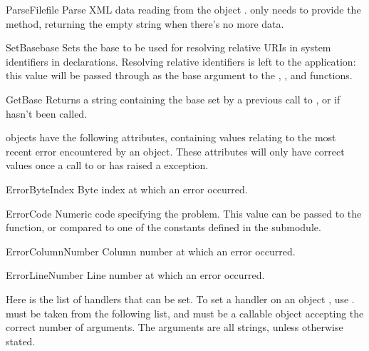 \begin{methoddesc}{ParseFile}{file}
Parse XML data reading from the object .   only
needs to provide the  method, returning the
empty string when there's no more data.
\end{methoddesc}

\begin{methoddesc}{SetBase}{base}
Sets the base to be used for resolving relative URIs in system identifiers in
declarations.  Resolving relative identifiers is left to the application:
this value will be passed through as the base argument to the
, ,
and  functions. 
\end{methoddesc}

\begin{methoddesc}{GetBase}{}
Returns a string containing the base set by a previous call to
, or  if 
 hasn't been called.
\end{methoddesc}

 objects have the following attributes, containing 
values relating to the most recent error encountered by an
 object. These attributes will only have correct
values once a call to  or 
has raised a  exception.

\begin{datadesc}{ErrorByteIndex} 
Byte index at which an error occurred.
\end{datadesc} 

\begin{datadesc}{ErrorCode} 
Numeric code specifying the problem.  This value can be passed to the
 function, or compared to one of the constants
defined in the  submodule.
\end{datadesc}

\begin{datadesc}{ErrorColumnNumber} 
Column number at which an error occurred.
\end{datadesc}

\begin{datadesc}{ErrorLineNumber}
Line number at which an error occurred.
\end{datadesc}

Here is the list of handlers that can be set.  To set a handler on an
 object , use .     must be taken from the following list, and  must be a callable object accepting the correct number of arguments.  The arguments are all strings, unless otherwise stated.

